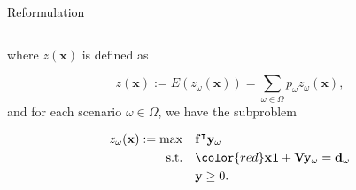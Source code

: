 \begin{frame}{Reformulation}
\begin{columns}
\begin{column}{0.5\textwidth}
      where $z(\mathbf{x})$ is defined as 

    $$z(\mathbf{x}) := E(z_{\omega}(\mathbf{x})) = \sum_{\omega \in \Omega} p_{\omega} z_{\omega}(\mathbf{x}),$$ and for each scenario $\omega \in \Omega$, we have the subproblem

\begin{equation}\label{BD_sub}
  \begin{aligned}
    z_{\omega}(\mathbf{x}) := \max \quad & \mathbf{f}^{\intercal} \mathbf{y}_{\omega} \\
    \text {s.t.} \quad & {\color{red}\mathbf{x} \mathbf{1} + \mathbf{V} \mathbf{y}_{\omega} = \mathbf{d}_{\omega}} \\
     & \mathbf{y} \geq 0.
  \end{aligned}
  \end{equation}
    \end{column}
\end{columns}
\end{frame}






